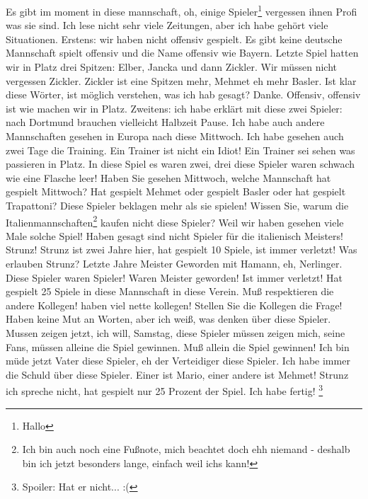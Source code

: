 
Es gibt im \gls{moment} in diese \gls{mannschaft}, oh, einige Spieler\footnote{Hallo} vergessen ihnen Profi was sie sind. Ich lese nicht sehr viele Zeitungen, aber ich habe gehört viele Situationen. Erstens: wir haben nicht offensiv gespielt. Es gibt keine deutsche Mannschaft spielt offensiv und die Name offensiv wie Bayern. Letzte Spiel hatten wir in Platz drei Spitzen: Elber, Jancka und dann Zickler. Wir müssen nicht vergessen Zickler. Zickler ist eine Spitzen mehr, Mehmet eh mehr Basler. Ist klar diese Wörter, ist möglich verstehen, was ich hab gesagt? Danke. Offensiv, offensiv ist wie machen wir in Platz. Zweitens: ich habe erklärt mit diese zwei Spieler: nach Dortmund brauchen vielleicht Halbzeit Pause. Ich habe auch andere Mannschaften gesehen in Europa nach diese Mittwoch. Ich habe gesehen auch zwei Tage die Training. Ein Trainer ist nicht ein Idiot! Ein Trainer sei sehen was passieren in Platz. In diese Spiel es waren zwei, drei diese Spieler waren schwach wie eine Flasche leer! Haben Sie gesehen Mittwoch, welche Mannschaft hat gespielt Mittwoch? Hat gespielt Mehmet oder gespielt Basler oder hat gespielt Trapattoni? Diese Spieler beklagen mehr als sie spielen! Wissen Sie, warum die Italienmannschaften\footnote{Ich bin auch noch eine Fußnote, mich beachtet doch ehh niemand - deshalb bin ich jetzt besonders lange, einfach weil ichs kann!} kaufen nicht diese Spieler? Weil wir haben gesehen viele Male solche Spiel! Haben gesagt sind nicht Spieler für die italienisch Meisters! Strunz! Strunz ist zwei Jahre hier, hat gespielt 10 Spiele, ist immer verletzt! Was erlauben Strunz? Letzte Jahre Meister Geworden mit Hamann, eh, Nerlinger. Diese Spieler waren Spieler! Waren Meister geworden! Ist immer verletzt! Hat gespielt 25 Spiele in diese Mannschaft in diese Verein. Muß respektieren die andere Kollegen! haben viel nette kollegen! Stellen Sie die Kollegen die Frage! Haben keine Mut an Worten, aber ich weiß, was denken über diese Spieler. Mussen zeigen jetzt, ich will, Samstag, diese Spieler müssen zeigen mich, seine Fans, müssen alleine die Spiel gewinnen. Muß allein die Spiel gewinnen! Ich bin müde jetzt Vater diese Spieler, eh der Verteidiger diese Spieler. Ich habe immer die Schuld über diese Spieler. Einer ist Mario, einer andere ist Mehmet! Strunz ich spreche nicht, hat gespielt nur 25 Prozent der Spiel. Ich habe fertig! \footnote{Spoiler: Hat er nicht... :(}
\clearpage

